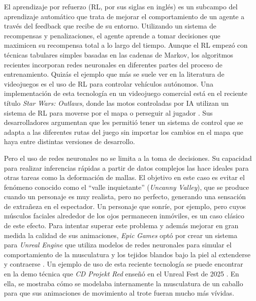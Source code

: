 El aprendizaje por refuerzo (RL, por sus siglas en inglés) es un subcampo del aprendizaje automático que trata de mejorar el comportamiento de un agente a través del feedback que recibe de su entorno. Utilizando un sistema de recompensas y penalizaciones, el agente aprende a tomar decisiones que maximicen su recompensa total a lo largo del tiempo. Aunque el RL empezó con técnicas tabulares simples basadas en las cadenas de Markov, los algoritmos recientes incorporan redes neuronales en diferentes partes del proceso \cite{ghasemi_comprehensive_2025} de entrenamiento. Quizás el ejemplo que más se suele ver en la literatura de videojuegos es el uso de RL para controlar vehículos autónomos. Una implementación de esta tecnología en un videojuego comercial está en el reciente título \textit{Star Wars: Outlaws}, donde las motos controladas por IA utilizan un sistema de RL para moverse por el mapa o perseguir al jugador \cite{gaudreau_game_2025}. Sus desarrolladores argumentan que les permitió tener un sistema de control que se adapta a las diferentes rutas del juego sin importar los cambios en el mapa que haya entre distintas versiones de desarrollo.

Pero el uso de redes neuronales no se limita a la toma de decisiones. Su capacidad para realizar inferencias rápidas a partir de datos complejos las hace ideales para otras tareas como la deformación de mallas. El objetivo en este caso es evitar el fenómeno conocido como el ``valle inquietante'' (\textit{Uncanny Valley}), que se produce cuando un personaje es muy realista, pero no perfecto, generando una sensación de extrañeza en el espectador. Un personaje que sonríe, por ejemplo, pero cuyos músculos faciales alrededor de los ojos permanecen inmóviles, es un caso clásico de este efecto. Para intentar superar este problema y además mejorar en gran medida la calidad de sus animaciones, \textit{Epic Games} optó por crear un sistema para \textit{Unreal Engine} que utiliza modelos de redes neuronales para simular el comportamiento de la musculatura y los tejidos blandos bajo la piel al extenderse y contraerse \cite{epic_games_ml_2025}. Un ejemplo de uso de esta reciente tecnología se puede encontrar en la demo técnica que \textit{CD Projekt Red} enseñó en el Unreal Fest de 2025 \cite{cd_projekt_red_witcher_2025}. En ella, se mostraba cómo se modelaba internamente la musculatura de un caballo para que sus animaciones de movimiento al trote fueran mucho más vívidas.


